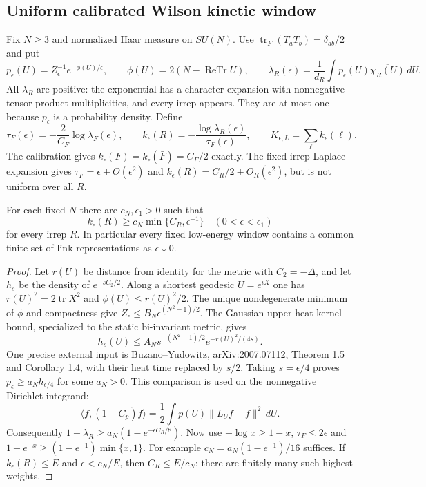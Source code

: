 \subsection{Uniform calibrated Wilson kinetic window}
\label{sec:wilson-kinetic-window}
Fix $N\ge3$ and normalized Haar measure on $SU(N)$. Use
$\operatorname{tr}_F(T_aT_b)=\delta_{ab}/2$ and put
\[
 p_\epsilon(U)=Z_\epsilon^{-1}e^{-\phi(U)/\epsilon},\qquad
 \phi(U)=2(N-\operatorname{ReTr}U),\qquad
 \lambda_R(\epsilon)=\frac1{d_R}\int p_\epsilon(U)\overline{\chi_R(U)}\,dU.
\]
All $\lambda_R$ are positive: the exponential has a character expansion with
nonnegative tensor-product multiplicities, and every irrep appears. They are
at most one because $p_\epsilon$ is a probability density. Define
\[
 \tau_F(\epsilon)=-\frac2{C_F}\log\lambda_F(\epsilon),\qquad
 k_\epsilon(R)=-\frac{\log\lambda_R(\epsilon)}{\tau_F(\epsilon)},\qquad
 K_{\epsilon,L}=\sum_\ell k_\epsilon(\ell).
\]
The calibration gives $k_\epsilon(F)=k_\epsilon(\bar F)=C_F/2$ exactly. The
fixed-irrep Laplace expansion gives $\tau_F=\epsilon+O(\epsilon^2)$ and
$k_\epsilon(R)=C_R/2+O_R(\epsilon^2)$, but is not uniform over all $R$.

\begin{lemma}
\label{lem:wilson-no-pollution}
For each fixed $N$ there are $c_N,\epsilon_1>0$ such that
\[
 k_\epsilon(R)\ge c_N\min\{C_R,\epsilon^{-1}\}
 \quad(0<\epsilon<\epsilon_1)
\]
for every irrep $R$. In particular every fixed low-energy window contains a
common finite set of link representations as $\epsilon\downarrow0$.
\end{lemma}
\begin{proof}
Let $r(U)$ be distance from identity for the metric with $C_2=-\Delta$, and
let $h_s$ be the density of $e^{-sC_2/2}$. Along a shortest geodesic
$U=e^{iX}$ one has $r(U)^2=2\operatorname{tr}X^2$ and
$\phi(U)\le r(U)^2/2$. The unique nondegenerate minimum of $\phi$ and
compactness give $Z_\epsilon\le B_N\epsilon^{(N^2-1)/2}$.
The Gaussian upper heat-kernel bound, specialized to the static bi-invariant
metric, gives
\[
 h_s(U)\le A_Ns^{-(N^2-1)/2}e^{-r(U)^2/(4s)}.
\]
One precise external input is Buzano--Yudowitz, arXiv:2007.07112,
Theorem 1.5 and Corollary 1.4, with their heat time replaced by $s/2$.
Taking $s=\epsilon/4$ proves $p_\epsilon\ge a_Nh_{\epsilon/4}$ for some
$a_N>0$. This comparison is used on the nonnegative Dirichlet integrand:
\[
 \langle f,(1-C_p)f\rangle
 =\frac12\int p(U)\|L_Uf-f\|^2\,dU.
\]
Consequently $1-\lambda_R\ge a_N(1-e^{-\epsilon C_R/8})$. Now use
$-\log x\ge1-x$, $\tau_F\le2\epsilon$ and
$1-e^{-x}\ge(1-e^{-1})\min\{x,1\}$. For example
$c_N=a_N(1-e^{-1})/16$ suffices. If $k_\epsilon(R)\le E$ and
$\epsilon<c_N/E$, then $C_R\le E/c_N$; there are finitely many such
highest weights.
\end{proof}

